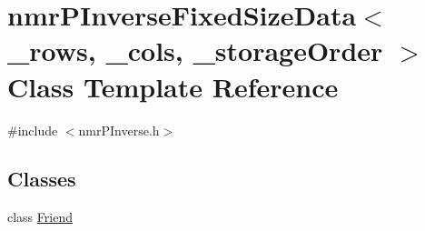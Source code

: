\hypertarget{classnmr_p_inverse_fixed_size_data}{\section{nmr\-P\-Inverse\-Fixed\-Size\-Data$<$ \-\_\-rows, \-\_\-cols, \-\_\-storage\-Order $>$ Class Template Reference}
\label{classnmr_p_inverse_fixed_size_data}
}


{\ttfamily \#include $<$nmr\-P\-Inverse.\-h$>$}

\subsection*{Classes}
\begin{DoxyCompactItemize}
\item 
class \hyperlink{classnmr_p_inverse_fixed_size_data_1_1_friend}{Friend}
\end{DoxyCompactItemize}
